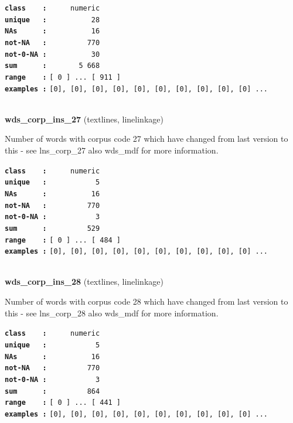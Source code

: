 \documentclass[]{article}
\begin{document}
\textbf{\texttt{class\ \ \ \ :}} \texttt{~~~~~numeric}\\
\textbf{\texttt{unique\ \ \ :}} \texttt{~~~~~~~~~~28}\\
\textbf{\texttt{NAs\ \ \ \ \ \ :}} \texttt{~~~~~~~~~~16}\\
\textbf{\texttt{not-NA\ \ \ :}} \texttt{~~~~~~~~~770}\\
\textbf{\texttt{not-0-NA\ :}} \texttt{~~~~~~~~~~30}\\
\textbf{\texttt{sum\ \ \ \ \ \ :}} \texttt{~~~~~~~5~668}\\
\textbf{\texttt{range\ \ \ \ :}}
\texttt{{[}\ 0\ {]}\ ...\ {[}\ 911\ {]}}\\
\textbf{\texttt{examples\ :}}
\texttt{{[}0{]},\ {[}0{]},\ {[}0{]},\ {[}0{]},\ {[}0{]},\ {[}0{]},\ {[}0{]},\ {[}0{]},\ {[}0{]},\ {[}0{]}\ ...}\\

~

\textbf{wds\_corp\_ins\_27} (textlines, linelinkage)

Number of words with corpus code 27 which have changed from last version
to this - see lns\_corp\_27 also wds\_mdf for more information.

\textbf{\texttt{class\ \ \ \ :}} \texttt{~~~~~numeric}\\
\textbf{\texttt{unique\ \ \ :}} \texttt{~~~~~~~~~~~5}\\
\textbf{\texttt{NAs\ \ \ \ \ \ :}} \texttt{~~~~~~~~~~16}\\
\textbf{\texttt{not-NA\ \ \ :}} \texttt{~~~~~~~~~770}\\
\textbf{\texttt{not-0-NA\ :}} \texttt{~~~~~~~~~~~3}\\
\textbf{\texttt{sum\ \ \ \ \ \ :}} \texttt{~~~~~~~~~529}\\
\textbf{\texttt{range\ \ \ \ :}}
\texttt{{[}\ 0\ {]}\ ...\ {[}\ 484\ {]}}\\
\textbf{\texttt{examples\ :}}
\texttt{{[}0{]},\ {[}0{]},\ {[}0{]},\ {[}0{]},\ {[}0{]},\ {[}0{]},\ {[}0{]},\ {[}0{]},\ {[}0{]},\ {[}0{]}\ ...}\\

~

\textbf{wds\_corp\_ins\_28} (textlines, linelinkage)

Number of words with corpus code 28 which have changed from last version
to this - see lns\_corp\_28 also wds\_mdf for more information.

\textbf{\texttt{class\ \ \ \ :}} \texttt{~~~~~numeric}\\
\textbf{\texttt{unique\ \ \ :}} \texttt{~~~~~~~~~~~5}\\
\textbf{\texttt{NAs\ \ \ \ \ \ :}} \texttt{~~~~~~~~~~16}\\
\textbf{\texttt{not-NA\ \ \ :}} \texttt{~~~~~~~~~770}\\
\textbf{\texttt{not-0-NA\ :}} \texttt{~~~~~~~~~~~3}\\
\textbf{\texttt{sum\ \ \ \ \ \ :}} \texttt{~~~~~~~~~864}\\
\textbf{\texttt{range\ \ \ \ :}}
\texttt{{[}\ 0\ {]}\ ...\ {[}\ 441\ {]}}\\
\textbf{\texttt{examples\ :}}
\texttt{{[}0{]},\ {[}0{]},\ {[}0{]},\ {[}0{]},\ {[}0{]},\ {[}0{]},\ {[}0{]},\ {[}0{]},\ {[}0{]},\ {[}0{]}\ ...}\\
\end{document}

